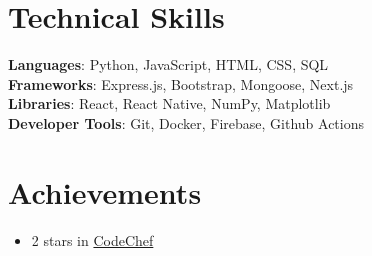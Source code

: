 \documentclass[letterpaper,11pt]{article}
\begin{document}
%
\section{Technical Skills}
 \begin{itemize}[leftmargin=0.15in, label={}]
    \small{\item{
     \textbf{Languages}{: Python, JavaScript, HTML, CSS, SQL} \\
     \textbf{Frameworks}{: Express.js, Bootstrap, Mongoose, Next.js} \\
     \textbf{Libraries}{: React, React Native, NumPy, Matplotlib} \\
     \textbf{Developer Tools}{: Git, Docker, Firebase, Github Actions }
    }}
 \end{itemize}


\section{Achievements}
\begin{itemize}[leftmargin=0.15in]
    \item \small{2 stars in  \href{https://www.codechef.com/users/sbrjt}{CodeChef}}
\end{itemize}


\end{document}
